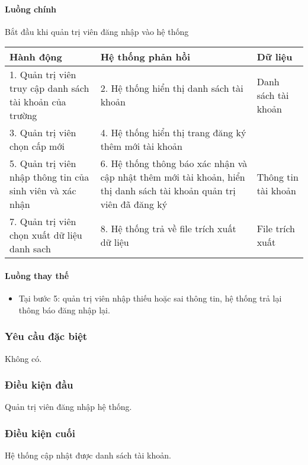 \documentclass[./../main_file.tex]{subfiles}
\begin{document}
\paragraph{Luồng chính}
 Bắt đầu khi quản trị viên đăng nhập vào hệ thống
\begin{longtable}{|p{}|p{}|p{}|}
 		\hline
 		\textbf{Hành động}                                       & \textbf{Hệ thống phản hồi}                            & \textbf{Dữ liệu}    \\ \hline
 		1. Quản trị viên truy cập danh sách tài khoản của trường & 2. Hệ thống hiển thị danh sách tài khoản              & Danh sách tài khoản \\ \hline
 		3. Quản trị viên chọn cấp mới                            & 4. Hệ thống hiển thị trang đăng ký thêm mới tài khoản &                     \\ \hline
 		5. Quản trị viên nhập thông tin của sinh viên và  xác nhận &
 		6. Hệ thống thông báo xác nhận và cập nhật thêm mới tài khoản, hiển thị danh sách tài khoản quản trị viên đã đăng ký &
 		Thông tin tài khoản \\ \hline
 		7. Quản trị viên chọn xuất dữ liệu danh sach             & 8. Hệ thống trả về file trích xuất dữ liệu            & File trích xuất     \\ \hline
\end{longtable}
\paragraph{Luồng thay thế}
\begin{itemize}
	\item Tại bước 5: quản trị viên nhập thiếu hoặc sai thông tin, hệ thống trả lại thông báo đăng nhập lại.
\end{itemize}
\subsubsection{Yêu cầu đặc biệt}
Không có.
\subsubsection{Điều kiện đầu}
Quản trị viên đăng nhập hệ thống.

\subsubsection{Điều kiện cuối}
Hệ thống cập nhật được danh sách tài khoản.
\end{document}
